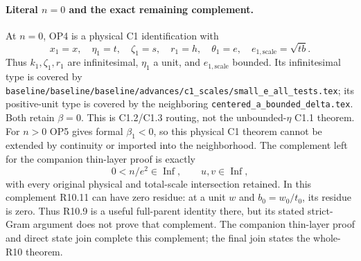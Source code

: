 \paragraph{Literal $n=0$ and the exact remaining complement.}
At $n=0$, OP4 is a physical C1 identification with
\[
 x_1=x,\quad\eta_1=t,\quad\zeta_1=s,\quad r_1=h,
 \quad\theta_1=e,\quad e_{1,\mathrm{scale}}=\sqrt{tb}.
\]
Thus $k_1,\zeta_1,r_1$ are infinitesimal, $\eta_1$ a unit, and
$e_{1,\mathrm{scale}}$ bounded. Its infinitesimal type is covered by
\texttt{baseline/baseline/baseline/advances/c1\_scales/small\_e\_all\_tests.tex};
its positive-unit type is covered by the neighboring
\texttt{centered\_a\_bounded\_delta.tex}. Both retain $\beta=0$.
This is C1.2/C1.3 routing, not the unbounded-$\eta$ C1.1 theorem.
For $n>0$ OP5 gives formal $\beta_1<0$, so this physical C1 theorem
cannot be extended by continuity or imported into the neighborhood.
The complement left for the companion thin-layer proof is exactly
\[
       0<n/e^2\in\operatorname{Inf},\qquad u,v\in\operatorname{Inf},
\]
with every original physical and total-scale intersection retained.
In this complement R10.11 can have zero residue: at a unit $w$ and
$b_0=w_0/t_0$, its residue is zero. Thus R10.9 is a useful full-parent
identity there, but its stated strict-Gram argument does not prove that
complement. The companion thin-layer proof and direct state join complete this complement; the final join states the whole-R10 theorem.
